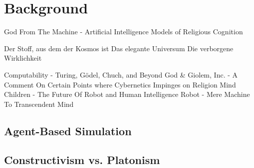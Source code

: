 \section{Background}

God From The Machine - Artificial Intelligence Models of Religious Cognition

Der Stoff, aus dem der Kosmos ist
Das elegante Universum
Die verborgene Wirklichkeit

Computability - Turing, Gödel, Chuch, and Beyond
God \& Giolem, Inc. - A Comment On Certain Points where Cybernetics Impinges on Religion
Mind Children - The Future Of Robot and Human Intelligence
Robot - Mere Machine To Transcendent Mind

\subsection{Agent-Based Simulation}

\subsection{Constructivism vs. Platonism}